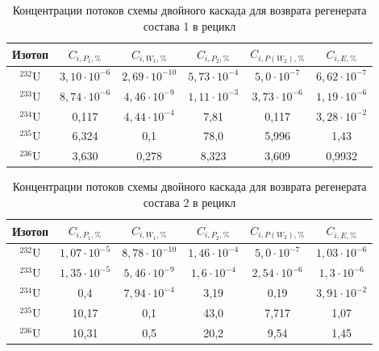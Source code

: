 \begin{table}[ht]
  \caption{Концентрации потоков схемы двойного каскада для возврата регенерата состава 1 в рецикл{\label{pure_double1}}}
  \begin{tabular}{|c||c|c|c|c|c|}
      \hline Изотоп & $C_{i,P_{1}, \%}$ & $C_{i,W_{1}, \%}$ & $C_{i,P_{2}, \%}$ & $C_{i,P(W_{2}), \%}$ & $C_{i,E, \%}$\\ \hline
      $^{232}$U & $3,10\cdot10^{-6}$ & $2,69\cdot10^{-10}$ & $5,73\cdot10^{-4}$ & $5,0\cdot10^{-7}$ & $6,62\cdot10^{-7}$ \\ \hline
      $^{233}$U & $8,74\cdot10^{-6}$ & $4,46\cdot10^{-9}$ & $1,11\cdot10^{-3}$ & $3,73\cdot10^{-6}$ & $1,19\cdot10^{-6}$ \\ \hline
      $^{234}$U & 0,117 & $4,44\cdot10^{-4}$ & 7,81 & 0,117 & $3,28\cdot10^{-2}$ \\ \hline
      $^{235}$U & 6,324 & 0,1 & 78,0 & 5,996 & 1,43 \\ \hline
      $^{236}$U & 3,630 & 0,278 & 8,323 & 3,609 & 0,9932 \\ \hline
      \end{tabular}     
\end{table}

\begin{table}[ht]
  \caption{Концентрации потоков схемы двойного каскада для возврата регенерата состава 2 в рецикл{\label{pure_double2}}}
  \begin{tabular}{|c||c|c|c|c|c|}
      \hline Изотоп & $C_{i,P_{1}, \%}$ & $C_{i,W_{1}, \%}$ & $C_{i,P_{2}, \%}$ & $C_{i,P(W_{2}), \%}$ & $C_{i,E, \%}$\\ \hline
      $^{232}$U & $1,07\cdot10^{-5}$ & $8,78\cdot10^{-10}$ & $1,46\cdot10^{-4}$ & $5,0\cdot10^{-7}$ & $1,03\cdot10^{-6}$ \\ \hline
      $^{233}$U & $1,35\cdot10^{-5}$ & $5,46\cdot10^{-9}$ & $1,6\cdot10^{-4}$ & $2,54\cdot10^{-6}$ & $1,3\cdot10^{-6}$ \\ \hline
      $^{234}$U & 0,4 & $7,94\cdot10^{-4}$ & 3,19 & 0,19 & $3,91\cdot10^{-2}$ \\ \hline
      $^{235}$U & 10,17 & 0,1 & 43,0 & 7,717 & 1,07 \\ \hline
      $^{236}$U & 10,31 & 0,5 & 20,2 & 9,54 & 1,45 \\ \hline
      \end{tabular}     
\end{table}

